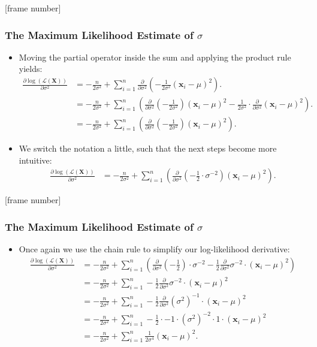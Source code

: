 \documentclass[aspectratio=169,t,xcolor=dvipsnames]{beamer}
\begin{document}
{
[frame number]
\begin{frame}
	\frametitle{The Maximum Likelihood Estimate of $\sigma$}
  \begin{itemize}
    \item Moving the partial operator inside the sum and applying the product rule yields:
    \begin{align}
      \frac{\partial \log\left(\mathcal{L}(\mathbf{X})\right)}{\partial \sigma^2} &= -\frac{n}{2\sigma^2} + \sum_{i=1}^{n} \frac{\partial}{\partial\sigma^2}\left(-\frac{1}{2\sigma^2} (\mathbf{x}_i-\mu)^2 \right). \\
      &= -\frac{n}{2\sigma^2} + \sum_{i=1}^{n} \left(\frac{\partial}{\partial\sigma^2} \left(-\frac{1}{2\sigma^2}\right) (\mathbf{x}_i-\mu)^2 - \frac{1}{2\sigma^2} \cdot \frac{\partial}{\partial\sigma^2} (\mathbf{x}_i-\mu)^2 \right). \\
      &= -\frac{n}{2\sigma^2} + \sum_{i=1}^{n} \left(\frac{\partial}{\partial\sigma^2} \left(-\frac{1}{2\sigma^2}\right) (\mathbf{x}_i-\mu)^2\right).
    \end{align}
    \item We switch the notation a little, such that the next steps become more intuitive:
    \begin{align}
      \frac{\partial \log\left(\mathcal{L}(\mathbf{X})\right)}{\partial \sigma^2} &= -\frac{n}{2\sigma^2} + \sum_{i=1}^{n} \left(\frac{\partial}{\partial\sigma^2} \left(-\frac{1}{2}\cdot \sigma^{-2}\right) (\mathbf{x}_i-\mu)^2\right).
    \end{align}
  \end{itemize}
\end{frame}
}

{
[frame number]
\begin{frame}
	\frametitle{The Maximum Likelihood Estimate of $\sigma$}
  \begin{itemize}
    \item Once again we use the chain rule to simplify our log-likelihood derivative:
    \begin{align}
      \frac{\partial \log\left(\mathcal{L}(\mathbf{X})\right)}{\partial \sigma^2} &= -\frac{n}{2\sigma^2} + \sum_{i=1}^{n} \left(\frac{\partial}{\partial\sigma^2} \left(-\frac{1}{2} \right) \cdot \sigma^{-2} - \frac{1}{2} \frac{\partial}{\partial\sigma^2} \sigma^{-2} \cdot (\mathbf{x}_i-\mu)^2\right) \\
      &=  -\frac{n}{2\sigma^2} + \sum_{i=1}^{n} - \frac{1}{2} \frac{\partial}{\partial\sigma^2} \sigma^{-2} \cdot (\mathbf{x}_i-\mu)^2 \\
      &=  -\frac{n}{2\sigma^2} + \sum_{i=1}^{n} - \frac{1}{2} \frac{\partial}{\partial\sigma^2} (\sigma^{2})^{-1} \cdot (\mathbf{x}_i-\mu)^2 \\
      &=  -\frac{n}{2\sigma^2} + \sum_{i=1}^{n} - \frac{1}{2} \cdot -1 \cdot (\sigma^{2})^{-2} \cdot 1 \cdot (\mathbf{x}_i-\mu)^2\\
      &=  -\frac{n}{2\sigma^2} + \sum_{i=1}^{n} \frac{1}{2\sigma^4} (\mathbf{x}_i-\mu)^2.
    \end{align}
  \end{itemize}
\end{frame}
}
\end{document}
